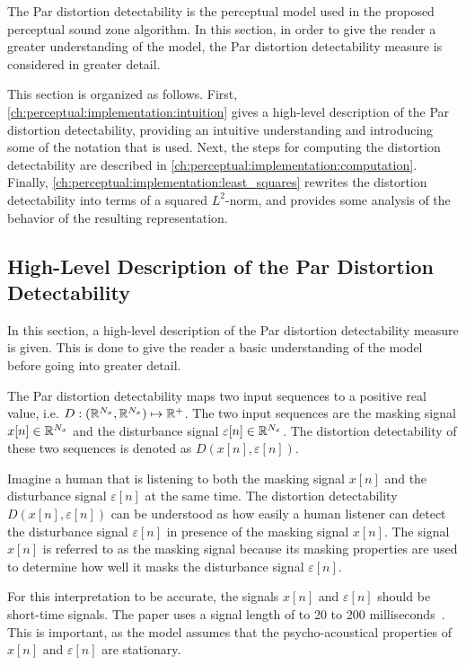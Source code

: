 The Par distortion detectability is the perceptual model used in the proposed perceptual sound zone algorithm.
In this section, in order to give the reader a greater understanding of the model, 
the Par distortion detectability measure is considered in greater detail.

This section is organized as follows.
First, \autoref{ch:perceptual:implementation:intuition} gives a high-level description of the 
Par distortion detectability, providing an intuitive understanding and introducing some of the notation that is used.
Next, the steps for computing the distortion detectability are described in 
\autoref{ch:perceptual:implementation:computation}.
Finally, \autoref{ch:perceptual:implementation:least_squares} rewrites the distortion detectability into terms of a 
squared $L^2$-norm, and provides some analysis of the behavior of the resulting representation.

\subsection{High-Level Description of the Par Distortion Detectability}
\label{ch:perceptual:implementation:intuition}
In this section, a high-level description of the Par distortion detectability measure is given.
This is done to give the reader a basic understanding of the model before going into greater detail.

The Par distortion detectability maps two input sequences to a positive real value, 
i.e. $D: (\mathbb{R}^{N_x}, \mathbb{R}^{N_x})\mapsto \mathbb{R}^{+}$.
The two input sequences are the masking signal $x[n]\in\mathbb{R}^{N_x}$ and the disturbance signal $\varepsilon[n]\in\mathbb{R}^{N_x}$.
The distortion detectability of these two sequences is denoted as $D(x[n], \varepsilon[n])$. 

Imagine a human that is listening to both the masking signal $x[n]$ and the disturbance signal $\varepsilon[n]$ 
at the same time.
The distortion detectability $D(x[n], \varepsilon[n])$ can be understood as how easily a human listener can 
detect the disturbance signal $\varepsilon[n]$ in presence of the masking signal $x[n]$.
The signal $x[n]$ is referred to as the masking signal because its masking properties are used to 
determine how well it masks the disturbance signal $\varepsilon[n]$.

For this interpretation to be accurate, the signals $x[n]$ and $\varepsilon[n]$ should be short-time signals.
The paper uses a signal length of to 20 to 200 milliseconds~\cite{van2005perceptual}.    
This is important, as the model assumes that the psycho-acoustical properties of $x[n]$ 
and $\varepsilon[n]$ are stationary.  

